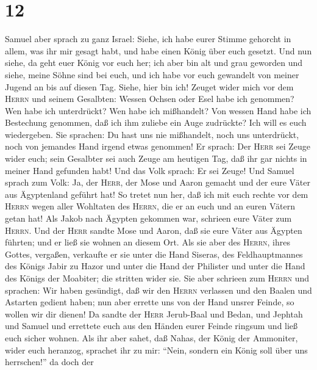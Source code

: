 \hypertarget{section-11}{%
\section{12}\label{section-11}}

 Samuel aber sprach zu ganz Israel: Siehe, ich habe eurer
Stimme gehorcht in allem, was ihr mir gesagt habt, und habe einen König
über euch gesetzt.  Und nun siehe, da geht euer König vor
euch her; ich aber bin alt und grau geworden und siehe, meine Söhne sind
bei euch, und ich habe vor euch gewandelt von meiner Jugend an bis auf
diesen Tag.  Siehe, hier bin ich! Zeuget wider mich vor
dem \textsc{Herrn} und seinem Gesalbten: Wessen Ochsen oder Esel habe
ich genommen? Wen habe ich unterdrückt? Wen habe ich mißhandelt? Von
wessen Hand habe ich Bestechung genommen, daß ich ihm zuliebe ein Auge
zudrückte? Ich will es euch wiedergeben.  Sie sprachen: Du
hast uns nie mißhandelt, noch uns unterdrückt, noch von jemandes Hand
irgend etwas genommen!  Er sprach: Der \textsc{Herr} sei
Zeuge wider euch; sein Gesalbter sei auch Zeuge am heutigen Tag, daß ihr
gar nichts in meiner Hand gefunden habt! Und das Volk sprach: Er sei
Zeuge!  Und Samuel sprach zum Volk: Ja, der \textsc{Herr},
der Mose und Aaron gemacht und der eure Väter aus Ägyptenland geführt
hat!  So tretet nun her, daß ich mit euch rechte vor dem
\textsc{Herrn} wegen aller Wohltaten des \textsc{Herrn}, die er an euch
und an euren Vätern getan hat!  Als Jakob nach Ägypten
gekommen war, schrieen eure Väter zum \textsc{Herrn}. Und der
\textsc{Herr} sandte Mose und Aaron, daß sie eure Väter aus Ägypten
führten; und er ließ sie wohnen an diesem Ort.  Als sie
aber des \textsc{Herrn}, ihres Gottes, vergaßen, verkaufte er sie unter
die Hand Siseras, des Feldhauptmannes des Königs Jabir zu Hazor und
unter die Hand der Philister und unter die Hand des Königs der Moabiter;
die stritten wider sie.  Sie aber schrieen zum
\textsc{Herrn} und sprachen: Wir haben gesündigt, daß wir den
\textsc{Herrn} verlassen und den Baalen und Astarten gedient haben; nun
aber errette uns von der Hand unsrer Feinde, so wollen wir dir dienen!
 Da sandte der \textsc{Herr} Jerub-Baal und Bedan, und
Jephtah und Samuel und errettete euch aus den Händen eurer Feinde
ringsum und ließ euch sicher wohnen.  Als ihr aber sahet,
daß Nahas, der König der Ammoniter, wider euch heranzog, sprachet ihr zu
mir: ``Nein, sondern ein König soll über uns herrschen!'' da doch der
